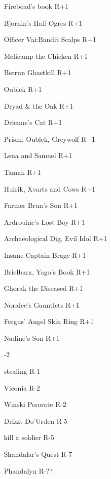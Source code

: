 \documentclass[10pt,a4,twoside]{book}
\begin{document}
\begin{multicols}{3}
\begin{titlepage}
\begin{trivlist}
\item Firebead's book \textcolor{OliveGreen}{R+1}
\item Bjornin's Half-Ogres \textcolor{OliveGreen}{R+1}
\item Officer Vai:Bandit Scalps \textcolor{OliveGreen}{R+1}
\item Melicamp the Chicken \textcolor{OliveGreen}{R+1}
\item Berrun Ghastkill \textcolor{OliveGreen}{R+1}
\item Oublek \textcolor{OliveGreen}{R+1}
\item Dryad \& the Oak \textcolor{OliveGreen}{R+1}
\item Drienne's Cat \textcolor{OliveGreen}{R+1}
\item Prism, Oublek, Greywolf \textcolor{OliveGreen}{R+1}
\item Lena and Samuel \textcolor{OliveGreen}{R+1}
\item Tamah \textcolor{OliveGreen}{R+1}
\item Hulrik, Xvarts and Cows \textcolor{OliveGreen}{R+1}
\item Farmer Brun's Son \textcolor{OliveGreen}{R+1}
\item Ardrouine's Lost Boy \textcolor{OliveGreen}{R+1}
\item Archaeological Dig, Evil Idol \textcolor{OliveGreen}{R+1}
\item Insane Captain Brage \textcolor{OliveGreen}{R+1}
\item Brielbara, Yago's Book \textcolor{OliveGreen}{R+1}
\item Ghorak the Diseased \textcolor{OliveGreen}{R+1}  
\item Noralee's Gauntlets \textcolor{OliveGreen}{R+1}
\item Fergus' Angel Skin Ring \textcolor{OliveGreen}{R+1}
\item Nadine's Son \textcolor{OliveGreen}{R+1}
\end{trivlist}
-2
\begin{trivlist}
\item stealing \textcolor{Mahogany}{R-1}
\item Viconia \textcolor{Mahogany}{R-2}
\item Winski Perorate \textcolor{Mahogany}{R-2}
\item Drizzt Do'Urden  \textcolor{Mahogany}{R-5}
\item kill a soldier  \textcolor{Mahogany}{R-5}
\item Shandalar's Quest  \textcolor{Mahogany}{R-7}
\item Phandalyn  \textcolor{Mahogany}{R-??}
\end{trivlist}


\end{titlepage}
\end{multicols}
\end{document}
